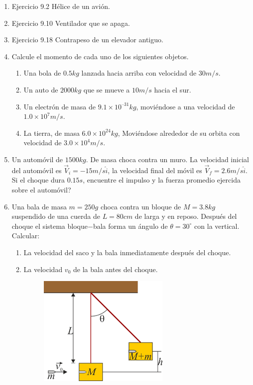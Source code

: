 \documentclass[letterpaper,10pt,onecolumn]{article}
\begin{document}
\begin{enumerate}

\item Ejercicio 9.2 H\'elice de un avi\'on.
\item Ejercicio 9.10 Ventilador que se apaga.
\item Ejercicio 9.18 Contrapeso de un elevador antiguo.
\item Calcule el momento de cada uno de los siguientes objetos. 
 \begin{enumerate}
\item Una bola de $0.5kg$ lanzada hacia arriba con velocidad de $30m/s$. 
\item Un auto de $2000kg$ que se mueve a $10m/s$ hacia el sur.
\item Un electrón de masa de $9.1×10^{–31}kg$, moviéndose a una velocidad de $1.0×10^7m/s$.
\item  La tierra, de masa $6.0×10^{24}kg$, Moviéndose alrededor de su orbita con velocidad de $3.0×10^4m/s$.
\end{enumerate}
\item Un automóvil de $1500kg$. De masa choca contra un muro. La velocidad inicial del automóvil es $\vec{V}_i=-15m/s\hat{i}$, la velocidad final del móvil es $\vec{V}_f=2.6m/s\hat{i}$. Si el choque dura $0.15s$, encuentre el impulso y la fuerza promedio ejercida sobre el automóvil?
\item Una bala de masa $m=250g$ choca contra un bloque de $M=3.8kg$ suspendido de una cuerda de $L=80cm$ de larga y en reposo. Después del choque el sistema bloque$-$bala forma un ángulo de $\theta=30^{\circ}$ con la vertical. Calcular:
\begin{enumerate}
\item La velocidad del saco y la bala inmediatamente después del choque.
\item  La velocidad $v_0$ de la bala antes del choque. 
\begin{figure}[h]
\begin{center} 
\includegraphics[scale=0.5]{bloquebalistico.png} 

\end{center}
\end{figure}
\end{enumerate}
\end{enumerate}
\end{document}
